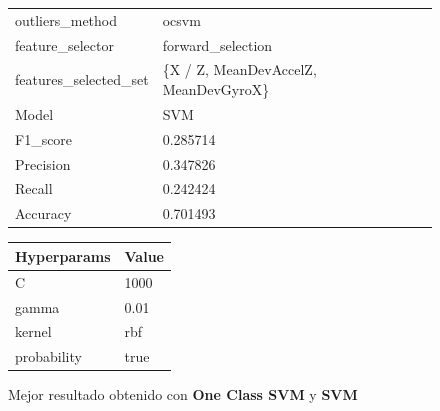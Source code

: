 \begin{appendices}
		\begin{figure}[htb]
			\centering
			\begin{tabular}{ll}
				\toprule
					  outliers\_method &                                ocsvm \\
					 feature\_selector &                    forward\_selection \\
				features\_selected\_set & \{X / Z, MeanDevAccelZ, MeanDevGyroX\} \\
								Model &                                  SVM \\
						F1\_score &                             0.285714 \\
					   Precision &                             0.347826 \\
						  Recall &                             0.242424 \\
						Accuracy &                             0.701493 \\
				\bottomrule
			\end{tabular}
			\newline
			\newline

			\begin{tabular}{ll}
				\toprule
				Hyperparams & Value \\
				\midrule
						  C &  1000 \\
					  gamma &  0.01 \\
					 kernel &   rbf \\
				probability &  true \\
				\bottomrule
			\end{tabular}
			\caption{Mejor resultado obtenido con \textbf{One Class SVM} y \textbf{SVM}}
			\label{table:28}
		\end{figure}


\end{appendices}

